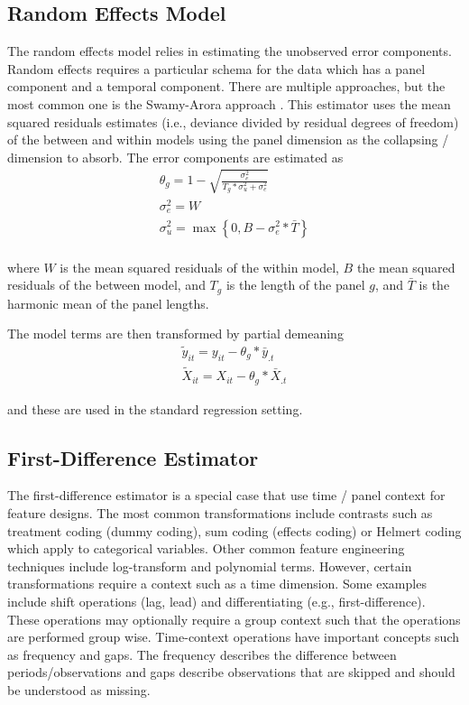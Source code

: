 \documentclass{juliacon}
\begin{document}
\subsection{Random Effects Model}

The random effects model relies in estimating the unobserved error components. Random effects requires a particular schema for the data which has a panel component and a temporal component. There are multiple approaches, but the most common one is the Swamy-Arora approach \cite{SwamyArora}. This estimator uses the mean squared residuals estimates (i.e., deviance divided by residual degrees of freedom) of the between and within models using the panel dimension as the collapsing / dimension to absorb. The error components are estimated as
\begin{equation}
\begin{split}
	\theta_{g} = 1 - \sqrt{\frac{\sigma_{e}^{2}}{T_{g} * \sigma_{u}^{2} + \sigma_{e}^{2}}} \\
	\sigma_{e}^{2} = W \\
	\sigma_{u}^{2} = \max\left\{0, B - \sigma_{e}^{2} * \bar{T}\right\} \\
\end{split}
\end{equation}

where $W$ is the mean squared residuals of the within model, $B$ the mean squared residuals of the between model, and $T_{g}$ is the length of the panel $g$, and $\bar{T}$ is the harmonic mean of the panel lengths.

The model terms are then transformed by partial demeaning
\begin{equation}
\begin{split}
\tilde{y}_{it} = y_{it} - \theta_{g} * \bar{y}_{.t} \\
\tilde{X}_{it} = X_{it} - \theta_{g} * \bar{X}_{.t}
\end{split}
\end{equation}

and these are used in the standard regression setting.

\subsection{First-Difference Estimator}

The first-difference estimator is a special case that use time / panel context for feature designs. The most common transformations include contrasts such as treatment coding (dummy coding), sum coding (effects coding) or Helmert coding which apply to categorical variables. Other common feature engineering techniques include log-transform and polynomial terms. However, certain transformations require a context such as a time dimension. Some examples include shift operations (lag, lead) and differentiating (e.g., first-difference). These operations may optionally require a group context such that the operations are performed group wise. Time-context operations have important concepts such as frequency and gaps. The frequency describes the difference between periods/observations and gaps describe observations that are skipped and should be understood as missing.
\end{document}
